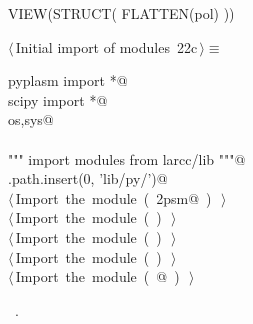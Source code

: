 \documentclass[11pt,oneside]{article}	%
\begin{document}
VIEW(STRUCT( FLATTEN(pol) ))


\begin{flushleft} \small \label{scrap43}
\protect{}$\langle\,$Initial import of modules\nobreak\ {\footnotesize 22c}$\,\rangle\equiv$
\vspace{-1ex}
\begin{list}{}{} \item
\mbox{}\verb@from pyplasm import *@\\
\mbox{}\verb@from scipy import *@\\
\mbox{}\verb@import os,sys@\\
\mbox{}\verb@@\\
\mbox{}\verb@""" import modules from larcc/lib """@\\
\mbox{}\verb@sys.path.insert(0, 'lib/py/')@\\
\mbox{}\verb@@\hbox{$\langle\,$Import the module\nobreak\ ({\footnotesize {}\label{scrap44}
 }\mbox{}\verb@lar2psm@ ) {\footnotesize {}}$\,\rangle$}\verb@@\\
\mbox{}\verb@@\hbox{$\langle\,$Import the module\nobreak\ ({\footnotesize {}\label{scrap45}
 }\mbox{}\verb@simplexn@ ) {\footnotesize {}}$\,\rangle$}\verb@@\\
\mbox{}\verb@@\hbox{$\langle\,$Import the module\nobreak\ ({\footnotesize {}\label{scrap46}
 }\mbox{}\verb@larcc@ ) {\footnotesize {}}$\,\rangle$}\verb@@\\
\mbox{}\verb@@\hbox{$\langle\,$Import the module\nobreak\ ({\footnotesize {}\label{scrap47}
 }\mbox{}\verb@largrid@ ) {\footnotesize {}}$\,\rangle$}\verb@@\\
\mbox{}\verb@@\hbox{$\langle\,$Import the module\nobreak\ ({\footnotesize {}\label{scrap48}
 }\mbox{}@ ) {\footnotesize {}}$\,\rangle$}\verb@@\\
\mbox{}\verb@@{\NWsep}
\end{list}
\vspace{-1ex}
\footnotesize\addtolength{\baselineskip}{-1ex}
\begin{list}{}{\setlength{\itemsep}{-\parsep}\setlength{\itemindent}{-\leftmargin}}
\item \NWtxtMacroRefIn\ .
\end{list}
\end{flushleft}
\end{document}
